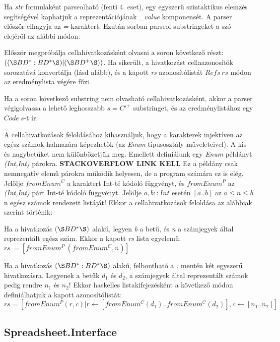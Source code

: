Ha \textit{str} formulaként parseolható (fenti 4. eset), egy egyszerű szintaktikus elemzés segítségével kaphatjuk a reprezentációjának \textit{\_value} komponensét. A parser először elhagyja az \textit{=} karaktert. Ezután sorban parseol substringeket a szó elejéről az alábbi módon:
\begin{compactenum}
	\item Először megpróbálja cellahivatkozásként olvasni a soron következő részt: $((\S  BD^*:BD^*\S )|(\S BD^+\S ))$. Ha sikerült, a hivatkozást cellaazonosítók sorozatává konvertálja (lásd alább), és a kapott \textit{rs} azonosítólistát $Refs\ rs$ módon az eredménylista végére fűzi.
	\item Ha a soron következő substring nem olvasható cellahivatkozásként, akkor a parser végigolvassa a lehető leghosszabb $s = C'^+$ substringet, és az eredménylistához egy $Code\ s$-t ír.
\end{compactenum}

A cellahivatkozások feloldásához kihasználjuk, hogy a karakterek injektíven az egész számok halmazára képezhetők (az \textit{Enum} típusosztály műveleteivel). A kis- és nagybetűket nem különbözetjük meg. Emellett definiálunk egy \textit{Enum} példányt \textit{(Int,Int)} párokra. \textbf{STACKOVERFLOW LINK KELL} Ez a példány csak nemnegatív elemű párokra működik helyesen, de a program számára ez is elég. Jelölje $fromEnum^C$ a karaktert Int-té kódoló függvényt, és $fromEnum^P$ az \textit{(Int,Int)} párt Int-té kódoló függvényt. Jelölje $a,b :: Int$ esetén $[a..b]$ az $a \le n \le b$ n egész számok rendezett listáját! Ekkor a cellahivatkozások feloldása az alábbiak szerint történik:
\begin{compactenum}
	\item Ha a hivatkozás $(\S BD^*\S )$ alakú, legyen \textit{b} a betű, és \textit{n} a számjegyek által reprezentált egész szám. Ekkor a kapott  \textit{rs} lista egyelemű. $rs\ = [fromEnum^P\ (fromEnum^C,n)]$
	\item Ha a hivatkozás $(\S  BD^*:BD^*\S )$ alakú, felbontható a \textit{:} mentén két egyszerű hivatkozásra. Legyenek a betűk $d_1$ és $d_2$, a számjegyek által reprezentált számok pedig rendre $n_1$ és $n_2$! Ekkor haskelles listakifejezésként a következő módon definiálhatjuk a kapott azonosítólistát:	\mbox{$rs = [fromEnum^P (r,c) | r \leftarrow [fromEnum^C(d_1)..fromEnum^C(d_2)], c \leftarrow [n_1..n_2]]$}

\end{compactenum}

\subsection{Spreadsheet.Interface}

